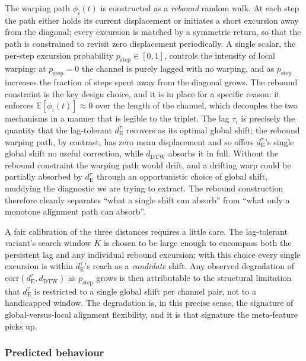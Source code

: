 \documentclass{article}
\theoremstyle{plain}
\theoremstyle{definition}
\theoremstyle{remark}
\begin{document}
The warping path $\phi_i(t)$ is constructed as a \emph{rebound} random walk. At each step the path either holds its current displacement or initiates a short excursion away from the diagonal; every excursion is matched by a symmetric return, so that the path is constrained to revisit zero displacement periodically. A single scalar, the per-step excursion probability $p_{\mathrm{step}} \in [0,1]$, controls the intensity of local warping: at $p_{\mathrm{step}}=0$ the channel is purely lagged with no warping, and as $p_{\mathrm{step}}$ increases the fraction of steps spent away from the diagonal grows. The rebound constraint is the key design choice, and it is in place for a specific reason: it enforces $\mathbb{E}[\phi_i(t)] \approx 0$ over the length of the channel, which decouples the two mechanisms in a manner that is legible to the triplet. The lag $\tau_i$ is precisely the quantity that the lag-tolerant $d_{\mathrm{E}}^{\tau}$ recovers as its optimal global shift; the rebound warping path, by contrast, has zero mean displacement and so offers $d_{\mathrm{E}}^{\tau}$'s single global shift no useful correction, while $d_{\mathrm{DTW}}$ absorbs it in full. Without the rebound constraint the warping path would drift, and a drifting warp could be partially absorbed by $d_{\mathrm{E}}^{\tau}$ through an opportunistic choice of global shift, muddying the diagnostic we are trying to extract. The rebound construction therefore cleanly separates ``what a single shift can absorb'' from ``what only a monotone alignment path can absorb''.

A fair calibration of the three distances requires a little care. The lag-tolerant variant's search window $K$ is chosen to be large enough to encompass both the persistent lag and any individual rebound excursion; with this choice every single excursion is within $d_{\mathrm{E}}^{\tau}$'s reach as a \emph{candidate} shift. Any observed degradation of $\mathrm{corr}(d_{\mathrm{E}}^{\tau}, d_{\mathrm{DTW}})$ as $p_{\mathrm{step}}$ grows is then attributable to the structural limitation that $d_{\mathrm{E}}^{\tau}$ is restricted to a single global shift per channel pair, not to a handicapped window. The degradation is, in this precise sense, the signature of global-versus-local alignment flexibility, and it is that signature the meta-feature picks up.

\subsubsection{Predicted behaviour}
\end{document}

